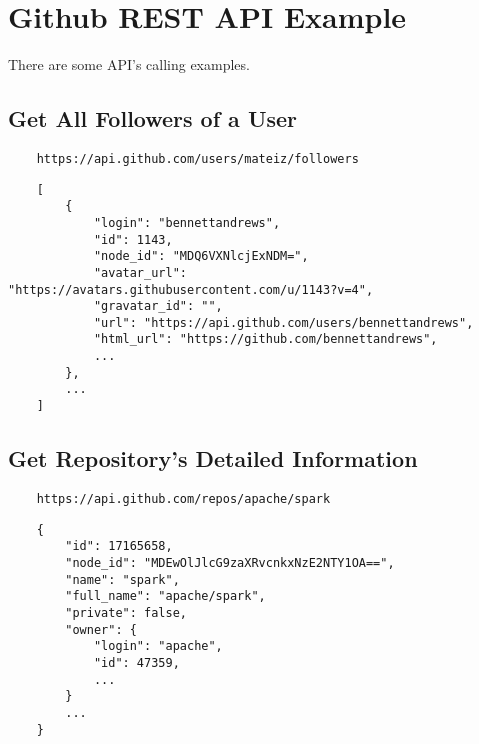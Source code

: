 \appendices

\section{Github REST API Example}
\label{a-ghrest}

There are some API's calling examples.


\subsection{Get All Followers of a User}

\begin{verbatim}
    https://api.github.com/users/mateiz/followers
\end{verbatim}


\begin{verbatim}
    [
        {
            "login": "bennettandrews",
            "id": 1143,
            "node_id": "MDQ6VXNlcjExNDM=",
            "avatar_url": "https://avatars.githubusercontent.com/u/1143?v=4",
            "gravatar_id": "",
            "url": "https://api.github.com/users/bennettandrews",
            "html_url": "https://github.com/bennettandrews",
            ...
        },
        ...
    ]
\end{verbatim}


\subsection{Get Repository's Detailed Information}

\begin{verbatim}
    https://api.github.com/repos/apache/spark
\end{verbatim}


\begin{verbatim}
    {
        "id": 17165658,
        "node_id": "MDEwOlJlcG9zaXRvcnkxNzE2NTY1OA==",
        "name": "spark",
        "full_name": "apache/spark",
        "private": false,
        "owner": {
            "login": "apache",
            "id": 47359,
            ...
        }
        ...
    }
\end{verbatim}



